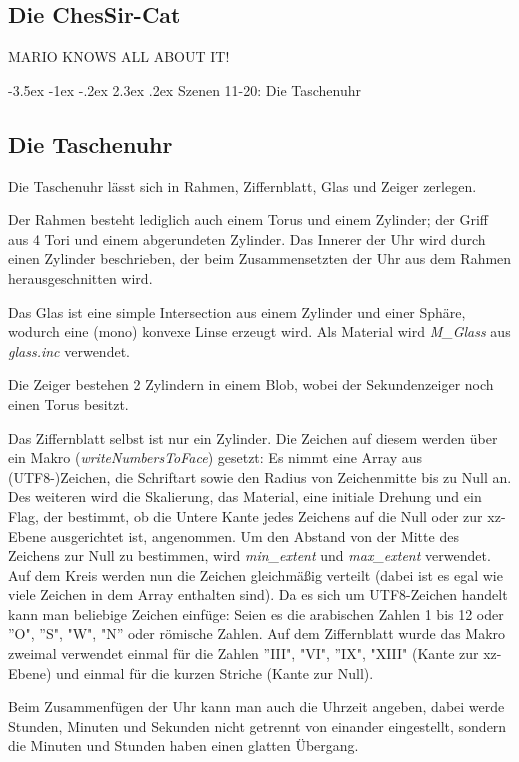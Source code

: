 \documentclass[twocolumn]{article}
\makeatletter
\renewcommand\section{\@startsection{section}{1}{\z@}%
                                      {-3.5ex \@plus -1ex \@minus -.2ex}%
                                      {2.3ex \@plus.2ex}%
                                      {\normalfont\large\bfseries}}
\makeatother
\begin{document}
\subsection{Die ChesSir-Cat}
MARIO KNOWS ALL ABOUT IT!

\section{Szenen 11-20: Die Taschenuhr}
\subsection{Die Taschenuhr}


Die Taschenuhr lässt sich in Rahmen, Ziffernblatt, Glas und Zeiger zerlegen.

Der Rahmen besteht lediglich auch einem Torus und einem Zylinder; der Griff aus 4 Tori und einem abgerundeten Zylinder.
Das Innerer der Uhr wird durch einen Zylinder beschrieben, der beim Zusammensetzten der Uhr aus dem Rahmen herausgeschnitten wird.

Das Glas ist eine simple Intersection aus einem Zylinder und einer Sphäre, wodurch eine (mono) konvexe Linse erzeugt wird.
Als Material wird  \textit{M\_Glass} aus \textit{glass.inc} verwendet.

Die Zeiger bestehen 2 Zylindern in einem Blob, wobei der Sekundenzeiger noch einen Torus besitzt.

Das Ziffernblatt selbst ist nur ein Zylinder. Die Zeichen auf diesem werden über ein Makro (\textit{writeNumbersToFace}) gesetzt:
Es nimmt eine Array aus (UTF8-)Zeichen, die Schriftart sowie den Radius von Zeichenmitte bis zu Null an. Des weiteren wird die Skalierung, das Material, eine initiale Drehung und ein Flag, der bestimmt, ob die Untere Kante jedes Zeichens auf die Null oder zur xz-Ebene ausgerichtet ist, angenommen. Um den Abstand von der Mitte des Zeichens zur Null zu bestimmen, wird \textit{min\_extent} und \textit{max\_extent} verwendet. Auf dem Kreis werden nun die Zeichen gleichmäßig verteilt (dabei ist es egal wie viele Zeichen in dem Array enthalten sind). Da es sich um UTF8-Zeichen handelt kann man beliebige Zeichen einfüge: Seien es die arabischen Zahlen 1 bis 12 oder  ''O", ''S", "W", "N'' oder römische Zahlen.
Auf dem Ziffernblatt wurde das Makro zweimal verwendet einmal für die Zahlen ''III", "VI", ''IX", "XIII" (Kante zur xz-Ebene) und einmal für die kurzen Striche (Kante zur Null).

Beim Zusammenfügen der Uhr kann man auch die Uhrzeit angeben, dabei werde Stunden, Minuten und Sekunden nicht getrennt von einander eingestellt, sondern die Minuten und Stunden haben einen glatten Übergang.
\end{document}
